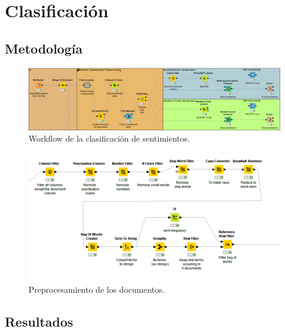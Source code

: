 \section{Clasificación}

\subsection{Metodología}

\begin{figure}[H]
    \center\includegraphics[width=.95\linewidth]{img/classification/workflow.png}
    \caption{Workflow de la clasificación de sentimientos.}
\end{figure}

\vspace{\baselineskip}

\begin{figure}[H]
    \center\includegraphics[width=.95\linewidth]{img/classification/preprocessing.png}
    \caption{Preprocesamiento de los documentos.}
\end{figure}


\subsection{Resultados}


